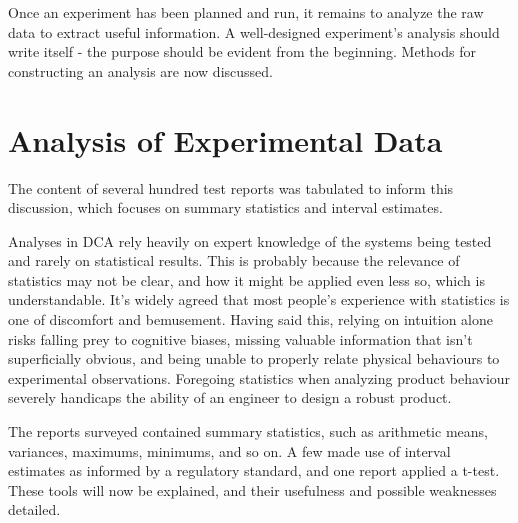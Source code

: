 \documentclass[11pt,a4paper,article]{memoir} %
\begin{document}
Once an experiment has been planned and run, it remains to analyze the raw data to extract useful information. A well-designed experiment's analysis should write itself - the purpose should be evident from the beginning. Methods for constructing an analysis are now discussed.

\newpage
\section{Analysis of Experimental Data}
The content of several hundred test reports was tabulated to inform this discussion, which focuses on summary statistics and interval estimates.
\par
Analyses in DCA rely heavily on expert knowledge of the systems being tested and rarely on statistical results. This is probably because the relevance of statistics may not be clear, and how it might be applied even less so, which is understandable. It's widely agreed that most people's experience with statistics is one of discomfort and bemusement. Having said this, relying on intuition alone risks falling prey to cognitive biases, missing valuable information that isn't superficially obvious, and being unable to properly relate physical behaviours to experimental observations. Foregoing statistics when analyzing product behaviour severely handicaps the ability of an engineer to design a robust product.
\par
The reports surveyed contained summary statistics, such as arithmetic means, variances, maximums, minimums, and so on. A few made use of interval estimates as informed by a regulatory standard, and one report applied a t-test. These tools will now be explained, and their usefulness and possible weaknesses detailed.
\par
\end{document}
